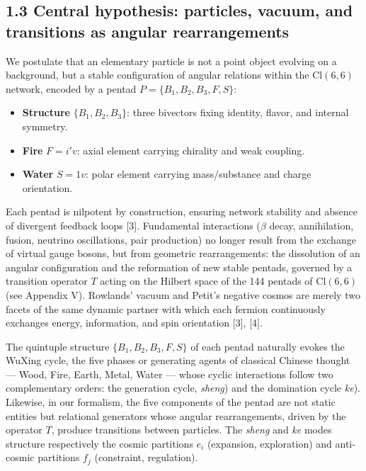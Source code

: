 \documentclass[11pt]{article}
\providecommand{\tightlist}{\setlength{\itemsep}{2pt}\setlength{\parskip}{6pt}}
\providecommand{\tightlist}{%
  \setlength{\itemsep}{2pt}\setlength{\parskip}{6pt}
}
\begin{document}
\hypertarget{central-hypothesis-particles-vacuum-and-transitions-as-angular-rearrangements}{%
\subsection{1.3 Central hypothesis: particles, vacuum, and transitions
as angular
rearrangements}\label{central-hypothesis-particles-vacuum-and-transitions-as-angular-rearrangements}}

We postulate that an elementary particle is not a point object evolving
on a background, but a stable configuration of angular relations within
the \(\text{Cl}(6,6)\) network, encoded by a pentad
\(P = \{B_1, B_2, B_3, F, S\}\):

\begin{itemize}
\tightlist
\item
  \textbf{Structure} \(\{B_1, B_2, B_3\}\): three bivectors fixing
  identity, flavor, and internal symmetry.
\item
  \textbf{Fire} \(F = i'v\): axial element carrying chirality and weak
  coupling.
\item
  \textbf{Water} \(S = 1v\): polar element carrying mass/substance and
  charge orientation.
\end{itemize}

Each pentad is nilpotent by construction, ensuring network stability and
absence of divergent feedback loops {[}3{]}. Fundamental interactions
(\(\beta\) decay, annihilation, fusion, neutrino oscillations, pair
production) no longer result from the exchange of virtual gauge bosons,
but from geometric rearrangements: the dissolution of an angular
configuration and the reformation of new stable pentads, governed by a
transition operator \(T\) acting on the Hilbert space of the 144 pentads
of \(\text{Cl}(6,6)\) (see Appendix V). Rowlands' vacuum and Petit's
negative cosmos are merely two facets of the same dynamic partner with
which each fermion continuously exchanges energy, information, and spin
orientation {[}3{]}, {[}4{]}.

The quintuple structure \(\{B_1, B_2, B_3, F, S\}\) of each pentad
naturally evokes the WuXing cycle, the five phases or generating agents
of classical Chinese thought --- Wood, Fire, Earth, Metal, Water ---
whose cyclic interactions follow two complementary orders: the
generation cycle, \textit{sheng}) and the domination cycle \textit{ke}).
Likewise, in our formalism, the five components of the pentad are not
static entities but relational generators whose angular rearrangements,
driven by the operator \(T\), produce transitions between particles. The
\textit{sheng} and \textit{ke} modes structure respectively the cosmic
partitions \(e_i\) (expansion, exploration) and anti-cosmic partitions
\(f_j\) (constraint, regulation).
\end{document}
